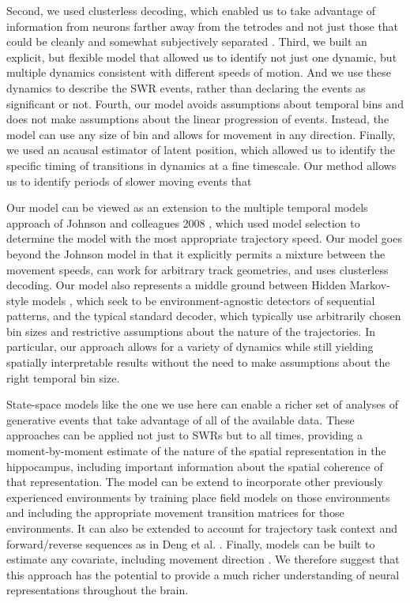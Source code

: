 \documentclass[times, twoside]{zHenriquesLab-StyleBioRxiv}
\begin{document}
Second, we used clusterless decoding, which enabled us to take advantage of information from neurons farther away from the tetrodes and not just those that could be cleanly and somewhat subjectively separated \cite{ChenBayesiannonparametricmethods2016, KloostermanBayesiandecodingusing2014, DengRapidclassificationhippocampal2016}. Third, we built an explicit, but flexible model that allowed us to identify not just one dynamic, but multiple dynamics consistent with different speeds of motion. And we use these dynamics to describe the SWR events, rather than declaring the events as significant or not. Fourth, our model avoids assumptions about temporal bins and does not make assumptions about the linear progression of events. Instead, the model can use any size of bin and allows for movement in any direction. Finally, we used an acausal estimator of latent position, which allowed us to identify the specific timing of transitions in dynamics at a fine timescale. Our method allows us to identify periods of slower moving events that 

Our model can be viewed as an extension to the multiple temporal models approach of Johnson and colleagues 2008 \cite{JohnsonMeasuringdistributedproperties2008}, which used model selection to determine the model with the most appropriate trajectory speed. Our model goes beyond the Johnson model in that it explicitly permits a mixture between the movement speeds, can work for arbitrary track geometries, and uses clusterless decoding. Our model also represents a middle ground between Hidden Markov-style models \cite{MaboudiUncoveringtemporalstructure2018, ChenBayesiannonparametricmethods2016, LindermanBayesiannonparametricapproach2016, ChenUncoveringspatialtopology2012}, which seek to be environment-agnostic detectors of sequential patterns, and the typical standard decoder, which typically use arbitrarily chosen bin sizes and restrictive assumptions about the nature of the trajectories. In particular, our approach allows for a variety of dynamics while still yielding spatially interpretable results without the need to make assumptions about the right temporal bin size.

State-space models like the one we use here can enable a richer set of analyses of generative events that take advantage of all of the available data. These approaches can be applied not just to SWRs but to all times, providing a moment-by-moment estimate of the nature of the spatial representation in the hippocampus, including important information about the spatial coherence of that representation. The model can be extend to incorporate other previously experienced environments by training place field models on those environments and including the appropriate movement transition matrices for those environments. It can also be extended to account for trajectory task context and forward/reverse sequences as in Deng et al. \cite{DengRapidclassificationhippocampal2016}. Finally, models can be built to estimate any covariate, including movement direction \cite{KayConstantSubsecondCycling2020}. We therefore suggest that this approach has the potential to provide a much richer understanding of neural representations throughout the brain. 
\end{document}
